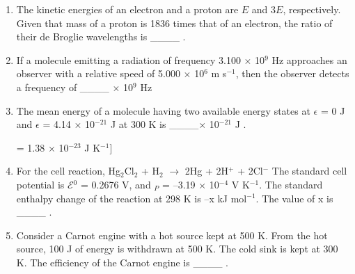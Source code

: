 \documentclass[journal,12pt,onecolumn]{IEEEtran}
\theoremstyle{remark}
\begin{document}
\begin{enumerate}
\item The kinetic energies of an electron  and a proton  are $E$ and $3E$, respectively. Given that mass of a proton is 1836 times that of an electron, the ratio of their de Broglie wavelengths  is \_\_\_\_ . \hfill{}


\item If a molecule emitting a radiation of frequency 3.100 $\times$ 10$^{9}$ Hz approaches an observer with a relative speed of 5.000 $\times$ 10$^{6}$ m s$^{-1}$, then the observer detects a frequency of \_\_\_\_ $\times$ 10$^{9}$ Hz 
 \hfill{}





\item The mean energy of a molecule having two available energy states at $\epsilon$ = 0 J and $\epsilon$ = 4.14 $\times$ 10$^{-21}$ J at 300 K is \_\_\_\_$\times$ 10$^{-21}$ J .



  = 1.38 $\times$ 10$^{-23}$ J K$^{-1}$] \hfill{}




\item For the cell reaction,
Hg$_{2}$Cl$_{2}$  + H$_{2}$  $\to$ 2Hg  + 2H$^{+}$ + 2Cl$^{-}$
The standard cell potential is $\mathcal{E}$$^{0}$ = 0.2676 V, and $_{P}$ = $\text{--}$3.19 $\times$ 10$^{-4}$ V K$^{-1}$. The standard enthalpy change of the reaction  at 298 K is $\text{--}$x kJ mol$^{-1}$. The value of x is \_\_\_\_ .

 \hfill{}




\item Consider a Carnot engine with a hot source kept at 500 K. From the hot source, 100 J of energy  is withdrawn at 500 K. The cold sink is kept at 300 K. The efficiency of the Carnot engine is \_\_\_\_ . \hfill{}





\end{enumerate}
\end{document}
